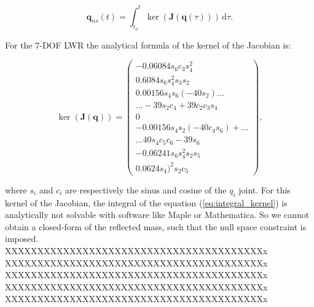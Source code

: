 \begin{equation}
\mathbf{q}_{ns}(t) = \int_{t_0}^t \! \ker(\mathbf{J}(\mathbf{q}(\tau))) \, \mathrm{d}\tau. 
\label{eq:integral_kernel}
\end{equation}

For the 7-DOF LWR the analytical formula of the kernel of the Jacobian is:

\begin{equation}
\ker(\mathbf{J}(\mathbf{q}))  =\begin{pmatrix} -0.06084s_6 c_3 s_4^2\\
0. 6084s_6 s_4^2 s_3 s_2\\
0.00156s_4 s_6 (-40s_2)...\\
...-39s_2 c_4 +39c_2 c_3 s_4\\
0\\
-0.00156s_4 s_2 (-40c_4 s_6)+...\\
...40s_4 c_5 c_6 -39s_6\\
-0.06241s_6 s_4^2 s_2 s_5\\
0.0624s_4)^2 s_2 c_5	
\end{pmatrix}	,
\label{eq:dq_ns}
\end{equation}


where $s_i$ and $c_i$ are respectively the sinus and cosine of the $q_i$ joint. For this kernel of the Jacobian, the integral of the equation (\ref{eq:integral_kernel}) is analytically not solvable with software like Maple or Mathematica. So we cannot obtain a closed-form of the reflected mass, such that the null space constraint is imposed.\\

XXXXXXXXXXXXXXXXXXXXXXXXXXXXXXXXXXXXXXXXx \\
XXXXXXXXXXXXXXXXXXXXXXXXXXXXXXXXXXXXXXXXx \\
XXXXXXXXXXXXXXXXXXXXXXXXXXXXXXXXXXXXXXXXx \\
XXXXXXXXXXXXXXXXXXXXXXXXXXXXXXXXXXXXXXXXx \\
XXXXXXXXXXXXXXXXXXXXXXXXXXXXXXXXXXXXXXXXx \\


